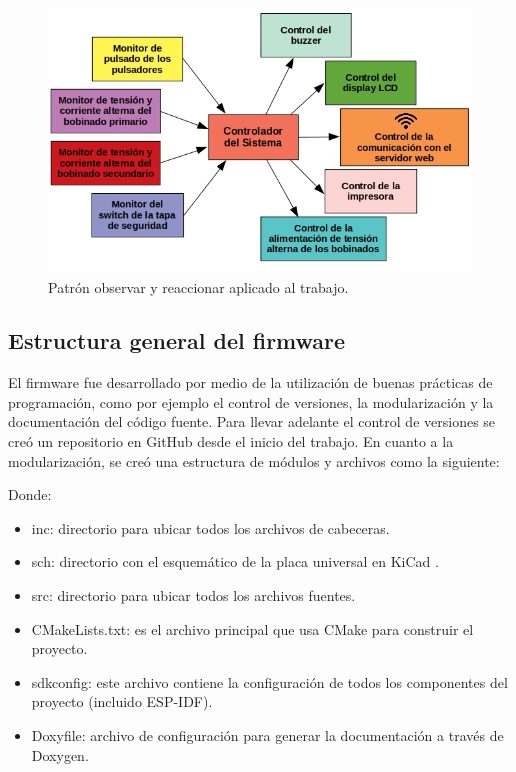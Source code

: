 \begin{figure}[htpb]
	\centering
	\includegraphics[scale=0.55]{./Figures/arquitecturaSoft.jpg}
	\caption{Patrón observar y reaccionar aplicado al trabajo.}
	\label{fig:patronAplicado}
\end{figure}



\subsection{Estructura general del firmware}

El firmware fue desarrollado por medio de la utilización de buenas prácticas de programación, como por ejemplo el control de versiones, la modularización y la documentación del código fuente. Para llevar adelante el control de versiones se creó un repositorio en GitHub \citep{TP_CESE} desde el inicio del trabajo. En cuanto a la modularización, se creó una estructura de módulos y archivos como la siguiente:


Donde: 
\begin{itemize}
\item inc: directorio para ubicar todos los archivos de cabeceras.
\item sch: directorio con el esquemático de la placa universal en KiCad \citep{KICAD}.
\item src: directorio para ubicar todos los archivos fuentes.
\item CMakeLists.txt: es el archivo principal que usa CMake para construir el proyecto.
\item sdkconfig: este archivo contiene la configuración de todos los componentes del proyecto (incluido ESP-IDF).
\item Doxyfile: archivo de configuración para generar la documentación a través de Doxygen.
\end{itemize}

